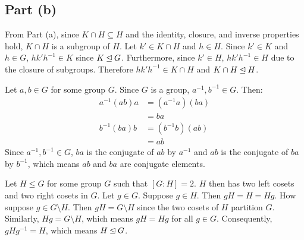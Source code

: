 \documentclass{article}
\begin{document}
\subsection*{Part (b)}
From Part (a), since $K \cap H \subseteq H$ and the identity, closure, and inverse properties hold, $K \cap H$ is a subgroup of $H$. Let $k' \in K \cap H$ and $h \in H$. Since $k' \in K$ and $h \in G$, $hk'h^{-1} \in K$ since $K \unlhd G$. Furthermore, since $k' \in H$, $hk'h^{-1} \in H$ due to the closure of subgroups. Therefore $hk'h^{-1} \in K \cap H$ and $K \cap H \unlhd H$.

\newpage

Let $a, b \in G$ for some group $G$. Since $G$ is a group, $a^{-1}, b^{-1} \in G$. Then:
\begin{equation}
    \begin{split}
        a^{-1}\left(ab\right)a & = \left(a^{-1}a\right)\left(ba\right) \\
        & = ba \\
        b^{-1}\left(ba\right)b & = \left(b^{-1}b\right)\left(ab\right) \\
        & = ab
    \end{split}
\end{equation}
Since $a^{-1}, b^{-1} \in G$, $ba$ is the conjugate of $ab$ by $a^{-1}$ and $ab$ is the conjugate of $ba$ by $b^{-1}$, which means $ab$ and $ba$ are conjugate elements.

\newpage

Let $H \leq G$ for some group $G$ such that $[G : H] = 2$. $H$ then has two left cosets and two right cosets in $G$. Let $g \in G$. Suppose $g \in H$. Then $gH = H = Hg$. How suppose $g \in G \setminus H$. Then $gH = G \setminus H$ since the two cosets of $H$ partition $G$. Similarly, $Hg = G \setminus H$, which means $gH = Hg$ for all $g \in G$. Consequently, $gHg^{-1} = H$, which means $H \unlhd G$.
\end{document}
